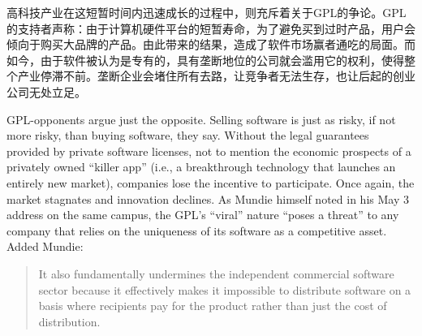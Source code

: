 \ifdefined\chs
高科技产业在这短暂时间内迅速成长的过程中，则充斥着关于GPL的争论。GPL的支持者声称：由于计算机硬件平台的短暂寿命，为了避免买到过时产品，用户会倾向于购买大品牌的产品。由此带来的结果，造成了软件市场赢者通吃的局面。而如今，由于软件被认为是专有的，具有垄断地位的公司就会滥用它的权利，使得整个产业停滞不前。垄断企业会堵住所有去路，让竞争者无法生存，也让后起的创业公司无处立足。
\fi

\ifdefined\eng
GPL-opponents argue just the opposite. Selling software is just as risky, if not more risky, than buying software, they say. Without the legal guarantees provided by private software licenses, not to mention the economic prospects of a privately owned ``killer app'' (i.e., a breakthrough technology that launches an entirely new market), companies lose the incentive to participate. Once again, the market stagnates and innovation declines. As Mundie himself noted in his May 3 address on the same campus, the GPL's ``viral'' nature ``poses a threat'' to any company that relies on the uniqueness of its software as a competitive asset. Added Mundie:
\begin{quote}
It also fundamentally undermines the independent commercial software sector because it effectively makes it impossible to distribute software on a basis where recipients pay for the product rather than just the cost of distribution.
\end{quote}

\fi

